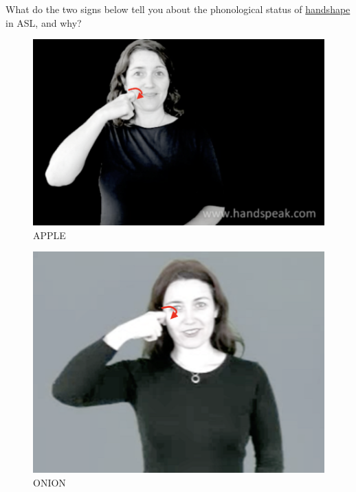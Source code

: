 \documentclass[12pt]{article}
\begin{document}
What do the two signs below tell you about the phonological status of \underline{handshape} in ASL, and why?\\

\begin{figure}[H]
\includegraphics{../images/asl_apple.png}
\caption{APPLE}
\end{figure}
\begin{figure}[H]
\includegraphics{../images/asl_onion.png}
\caption{ONION}
\end{figure}

\newpage

\begin{center}
\textbf{{\color{red}{\HUGE END OF EXAM}}}\\

\end{center}
\newpage
\end{document}
